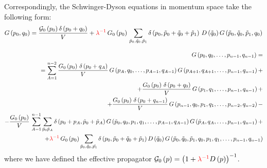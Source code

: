 \documentclass[12pt]{article}
\newcommand{\lr}[1]{ \left( #1 \right) }
\newcommand{\red}[1]{ \textcolor{red}{#1} }
\newcommand{\G}{\mathcal{G}}
\begin{document}
Correspondingly, the Schwinger-Dyson equations in momentum space take the following form:
\begin{eqnarray}
\label{SDs_n2_momentum}
 G\lr{p_0, q_0} = \frac{\G_0\lr{p_0} \delta\lr{p_0 + q_0}}{V}
 +
 \red{\lambda^{-1}} \, G_0\lr{p_0} \,
\sum\limits_{\tilde{p}_0, \tilde{q}_0, \tilde{p}_1}
\delta\lr{p_0, \tilde{p}_0 + \tilde{q}_0 + \tilde{p}_1} \,
D\lr{\tilde{q}_0} G\lr{\tilde{p}_0, \tilde{q}_0, \tilde{p}_1, q_0}
\end{eqnarray}

\begin{eqnarray}
\label{SDs_pcm_momentum}
 G\lr{p_0, q_0, \ldots, p_{n-1}, q_{n-1}}
 = \nonumber \\ =
 \sum\limits_{A=1}^{n-2}
 \frac{G_0\lr{p_0} \, \delta\lr{p_0 + q_A}}{V} \,
 G\lr{    p_A,     q_0, \ldots, p_{A-1}, q_{A-1}}
 G\lr{p_{A+1}, q_{A+1}, \ldots,     p_{n-1},    q_{n-1} }
 + \nonumber \\ +
 \frac{G_0\lr{p_0} \, \delta\lr{p_0 + q_0}}{V} \,
 G\lr{p_1, q_1, \ldots, p_{n-1}, q_{n-1}}
 + \nonumber \\ +
 \frac{G_0\lr{p_0} \, \delta\lr{p_0 + q_{n-1}}}{V} \,
 G\lr{p_{n-1}, q_0, p_1, q_1, \ldots, p_{n-2}, q_{n-2}}
 - \nonumber \\ -
 \frac{G_0\lr{p_0}}{V} \,
 \sum\limits_{A=1}^{n-1}
 \sum\limits_{\tilde{p}_0 \tilde{p}_A} \delta\lr{p_0 + p_A, \tilde{p}_0 + \tilde{p}_A}
 G\lr{\tilde{p}_0, q_0, p_1, q_1, \ldots, p_{A-1}, q_{A-1}}
 G\lr{\tilde{p}_A, q_A,           \ldots, p_{n-1}, q_{n-1}}
 + \nonumber \\ +
 \red{\lambda^{-1}} \, G_0\lr{p_0}
 \sum\limits_{\tilde{p}_0, \tilde{q}_0, \tilde{p_1}}
 \delta\lr{p_0, \tilde{p}_0 + \tilde{q}_0 + \tilde{p}_1} D\lr{\tilde{q}_0}
 G\lr{\tilde{p}_0, \tilde{q}_0, \tilde{p}_1, q_0, p_1, q_1, \ldots, p_{n-1}, q_{n-1}}
\end{eqnarray}
where we have defined the effective propagator $\G_0\lr{p} = \lr{1 + \red{\lambda^{-1}} D\lr{p}}^{-1}$.
\end{document}
